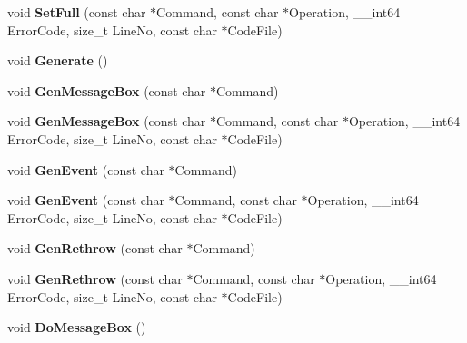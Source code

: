 \begin{DoxyCompactItemize}
\item 
\hypertarget{structcl_error_a6a09e83a1a4947d28d263e457a15dff9}{
void {\bfseries SetFull} (const char $\ast$Command, const char $\ast$Operation, \_\-\_\-int64 ErrorCode, size\_\-t LineNo, const char $\ast$CodeFile)}
\label{structcl_error_a6a09e83a1a4947d28d263e457a15dff9}

\item 
\hypertarget{structcl_error_a1ca4cd3efebbcfecca96e2117815d38f}{
void {\bfseries Generate} ()}
\label{structcl_error_a1ca4cd3efebbcfecca96e2117815d38f}

\item 
\hypertarget{structcl_error_a732c1af22b31d587189edb0cf5744062}{
void {\bfseries GenMessageBox} (const char $\ast$Command)}
\label{structcl_error_a732c1af22b31d587189edb0cf5744062}

\item 
\hypertarget{structcl_error_aea590a7a4a92e72f68e25cd70dda12d0}{
void {\bfseries GenMessageBox} (const char $\ast$Command, const char $\ast$Operation, \_\-\_\-int64 ErrorCode, size\_\-t LineNo, const char $\ast$CodeFile)}
\label{structcl_error_aea590a7a4a92e72f68e25cd70dda12d0}

\item 
\hypertarget{structcl_error_ad5067aec797fbd0d3ee4425871b2ea99}{
void {\bfseries GenEvent} (const char $\ast$Command)}
\label{structcl_error_ad5067aec797fbd0d3ee4425871b2ea99}

\item 
\hypertarget{structcl_error_acfbd64407d71bc3244412f44ea0a7362}{
void {\bfseries GenEvent} (const char $\ast$Command, const char $\ast$Operation, \_\-\_\-int64 ErrorCode, size\_\-t LineNo, const char $\ast$CodeFile)}
\label{structcl_error_acfbd64407d71bc3244412f44ea0a7362}

\item 
\hypertarget{structcl_error_a0efdc892136e8158c42f820aa7d29187}{
void {\bfseries GenRethrow} (const char $\ast$Command)}
\label{structcl_error_a0efdc892136e8158c42f820aa7d29187}

\item 
\hypertarget{structcl_error_a19e5962ae0af3c8a852d11fea511903b}{
void {\bfseries GenRethrow} (const char $\ast$Command, const char $\ast$Operation, \_\-\_\-int64 ErrorCode, size\_\-t LineNo, const char $\ast$CodeFile)}
\label{structcl_error_a19e5962ae0af3c8a852d11fea511903b}

\item 
\hypertarget{structcl_error_affa2290f12b3f909cc492b6b35253e66}{
void {\bfseries DoMessageBox} ()}
\label{structcl_error_affa2290f12b3f909cc492b6b35253e66}


\end{DoxyCompactItemize}
